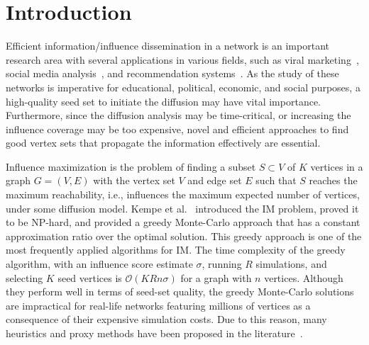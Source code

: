 \documentclass[review]{elsarticle}
\begin{document}
\section{Introduction}

Efficient information/influence dissemination in a network is an important research area with several applications in various fields, such as viral marketing~\cite{leskovec2007dynamics, trusov2009effects}, social media analysis~\cite{zeng2010social, moreno2004dynamics}, and recommendation systems~\cite{lu2012recommender}.
As the study of these networks is imperative for educational, political, economic, and social purposes, a high-quality seed set to initiate the diffusion may have vital importance.
Furthermore, since the diffusion analysis may be time-critical, or increasing the influence coverage may be too expensive, novel and efficient approaches to find good vertex sets that propagate the information effectively are essential.

Influence maximization is the problem of finding a subset $S \subset V$ of $K$ vertices in a graph $G = (V, E)$ with the vertex set $V$ and edge set $E$ such that $S$ reaches the maximum reachability, i.e., influences the maximum expected number of vertices, under some diffusion model. Kempe et al.~\cite{kempe2003maximizing} introduced the IM problem, proved it to be NP-hard, and provided a greedy Monte-Carlo approach that has a constant approximation ratio over the optimal solution. This greedy approach is one of the most frequently applied algorithms for IM. The time complexity of the greedy algorithm, with an influence score estimate $\sigma$, running $R$ simulations, and selecting $K$ seed vertices is $\mathcal{O}(KRn\sigma)$ for a graph with $n$ vertices. Although they perform well in terms of seed-set quality, the greedy Monte-Carlo solutions are impractical for real-life networks featuring millions of vertices as a consequence of their expensive simulation costs. Due to this reason, many heuristics and proxy methods have been proposed in the literature~\cite{MixGreedy, narayanam2010shapley, kimura2007extracting, chen2010PMIA,chen2010LDAG, kim2013scalable, cohen2014sketch, goyal2011simpath, jung2012irie,cheng2014imrank,liu2014influence,galhotra2016holistic}.

 
\end{document}
